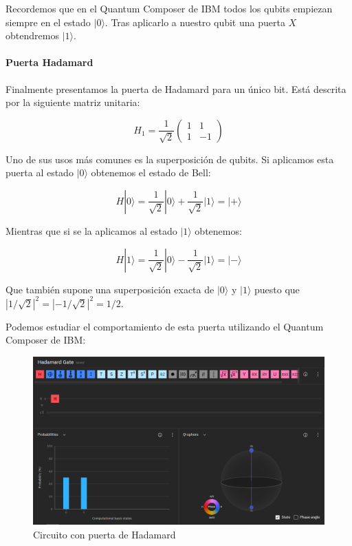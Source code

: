 \documentclass[11pt]{article}
\newcommand{\ra}{\rangle}
\newcommand{\ra}{\rangle}
\begin{document}
Recordemos que en el Quantum Composer de IBM todos los qubits empiezan siempre en el estado $|0\ra$. Tras aplicarlo a nuestro qubit una puerta $X$ obtendremos $|1\ra$.

\paragraph*{Puerta Hadamard}

Finalmente presentamos la puerta de Hadamard para un único bit. Está descrita por la siguiente matriz unitaria:

\[
	H_1 = \frac{1}{\sqrt 2}
	\begin{pmatrix}
		1 & 1 \\
		1 & -1 
	\end{pmatrix}
\]

Uno de sus usos más comunes es la superposición de qubits. Si aplicamos esta puerta al estado $|0\ra$ obtenemos el estado de Bell:

\[
	H|0\ra = \frac{1}{\sqrt 2} |0\ra + \frac{1}{\sqrt 2} |1\ra = |+\ra
\]

Mientras que si se la aplicamos al estado $|1\ra$ obtenemos:

\[
	H|1\ra = \frac{1}{\sqrt 2} |0\ra - \frac{1}{\sqrt 2} |1\ra = |-\ra
\]

Que también supone una superposición exacta de $|0\ra$ y $|1\ra$ puesto que $|1/\sqrt 2|^2 = |-1/\sqrt 2|^2 = 1/2$.

Podemos estudiar el comportamiento de esta puerta utilizando el Quantum Composer de IBM:

\begin{figure}[H]
	\centering
	\includegraphics[scale=0.4]{figures/gate-hadamard.png}
	\caption{Circuito con puerta de Hadamard}
\end{figure}
\end{document}

